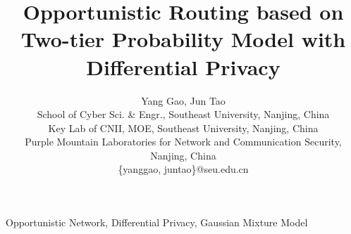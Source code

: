 \documentclass[10pt,conference]{IEEEtran}
\begin{document}
\title{
Opportunistic Routing based on Two-tier Probability Model
with Differential Privacy
}

\author{Yang Gao, Jun Tao\\
        School of Cyber Sci. \& Engr., Southeast University, Nanjing, China\\
        Key Lab of CNII, MOE, Southeast University, Nanjing, China\\
        Purple Mountain Laboratories for Network and Communication Security, Nanjing, China\\
        \{yanggao, juntao\}@seu.edu.cn
        }

\maketitle



\begin{IEEEkeywords}
Opportunistic Network, Differential Privacy, Gaussian Mixture Model
\end{IEEEkeywords}

\IEEEpeerreviewmaketitle











\end{document}
